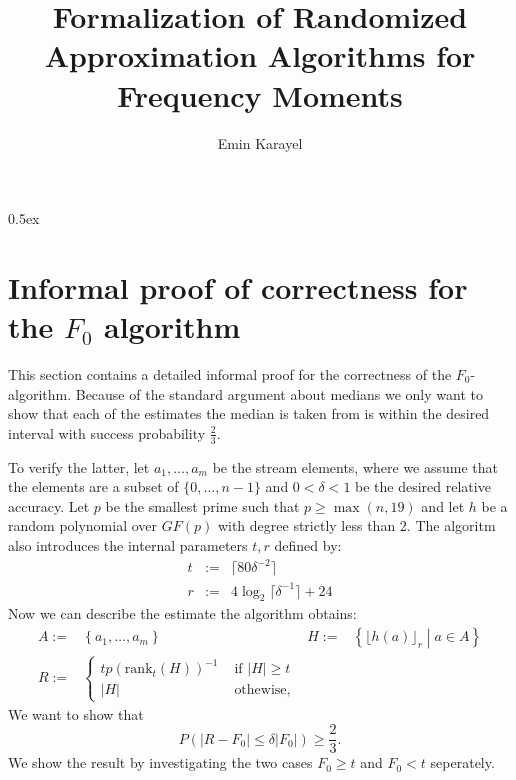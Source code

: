 \documentclass[11pt,a4paper]{article}
\newcommand{\size}[1]{\lvert#1\rvert}
\begin{document}
\title{Formalization of Randomized Approximation Algorithms for Frequency Moments}
\author{Emin Karayel}
\maketitle

\tableofcontents

\parindent 0pt\parskip 0.5ex


\appendix
\section{Informal proof of correctness for the $F_0$ algorithm}
This section contains a detailed informal proof for the correctness of the $F_0$-algorithm.
Because of the standard argument about medians we only want to show that each of the estimates the median is taken from is within the desired interval with success probability $\frac{2}{3}$.

To verify the latter, let $a_1, \ldots, a_m$ be the stream elements, where we assume that the elements are a subset of $\{0,\ldots,n-1\}$ and $0 < \delta < 1$ be the desired relative accuracy.
Let $p$ be the smallest prime such that $p \geq \max (n,19)$ and let $h$ be a random polynomial over $GF(p)$ with degree strictly less than $2$.
The algoritm also introduces the internal parameters $t, r$ defined by:
\begin{eqnarray*}
    t & := & \lceil 80\delta^{-2} \rceil \\
    r & := & 4 \log_2 \lceil \delta^{-1} \rceil + 24
\end{eqnarray*}
Now we can describe the estimate the algorithm obtains:
\begin{align*}
    A := & \left\{ a_1, \ldots, a_m \right\} &
    H := & \left\{ \lfloor h(a) \rfloor_r \middle \vert a \in A \right\} \\
    R := & \begin{cases} t p \left(\mathrm{rank}_t (H) \right)^{-1} & \textrm{ if } \size{H} \geq t \\
    \size{H} & \textrm{ othewise,} \end{cases} &
\end{align*}
We want to show that
\[
    P(\size{R - F_0} \leq \delta \size{F_0}) \geq \frac{2}{3} \textrm{.}  
\]
We show the result by investigating the two cases $F_0 \geq t$ and $F_0 < t$ seperately.
\end{document}
